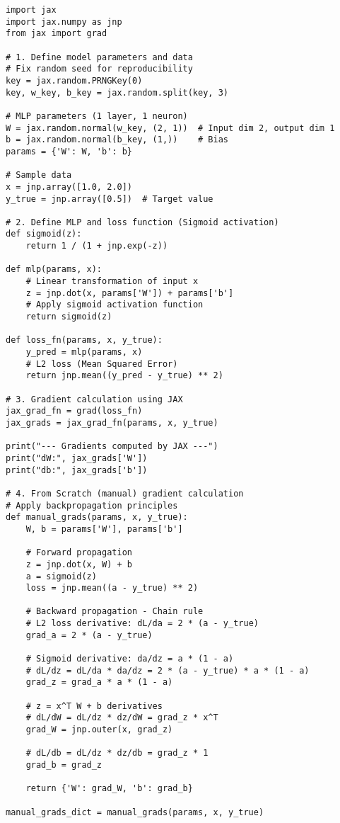 \documentclass{article}
\begin{document}
\begin{lstlisting}
import jax
import jax.numpy as jnp
from jax import grad

# 1. Define model parameters and data
# Fix random seed for reproducibility
key = jax.random.PRNGKey(0) 
key, w_key, b_key = jax.random.split(key, 3)

# MLP parameters (1 layer, 1 neuron)
W = jax.random.normal(w_key, (2, 1))  # Input dim 2, output dim 1
b = jax.random.normal(b_key, (1,))    # Bias
params = {'W': W, 'b': b}

# Sample data
x = jnp.array([1.0, 2.0])
y_true = jnp.array([0.5])  # Target value

# 2. Define MLP and loss function (Sigmoid activation)
def sigmoid(z):
    return 1 / (1 + jnp.exp(-z))

def mlp(params, x):
    # Linear transformation of input x
    z = jnp.dot(x, params['W']) + params['b']
    # Apply sigmoid activation function
    return sigmoid(z)

def loss_fn(params, x, y_true):
    y_pred = mlp(params, x)
    # L2 loss (Mean Squared Error)
    return jnp.mean((y_pred - y_true) ** 2)

# 3. Gradient calculation using JAX
jax_grad_fn = grad(loss_fn)
jax_grads = jax_grad_fn(params, x, y_true)

print("--- Gradients computed by JAX ---")
print("dW:", jax_grads['W'])
print("db:", jax_grads['b'])

# 4. From Scratch (manual) gradient calculation
# Apply backpropagation principles
def manual_grads(params, x, y_true):
    W, b = params['W'], params['b']

    # Forward propagation
    z = jnp.dot(x, W) + b
    a = sigmoid(z)
    loss = jnp.mean((a - y_true) ** 2)

    # Backward propagation - Chain rule
    # L2 loss derivative: dL/da = 2 * (a - y_true)
    grad_a = 2 * (a - y_true)

    # Sigmoid derivative: da/dz = a * (1 - a)
    # dL/dz = dL/da * da/dz = 2 * (a - y_true) * a * (1 - a)
    grad_z = grad_a * a * (1 - a)

    # z = x^T W + b derivatives
    # dL/dW = dL/dz * dz/dW = grad_z * x^T
    grad_W = jnp.outer(x, grad_z) 

    # dL/db = dL/dz * dz/db = grad_z * 1
    grad_b = grad_z
    
    return {'W': grad_W, 'b': grad_b}

manual_grads_dict = manual_grads(params, x, y_true)


\end{lstlisting}
\end{document}
